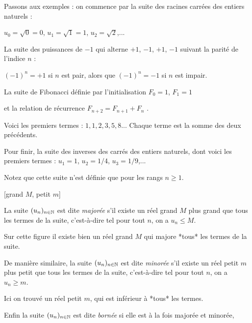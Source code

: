 \change

Passons aux exemples : on commence par la suite des racines carrées des entiers naturels :

$u_0=\sqrt{0}=0$,
$u_1=\sqrt{1}=1$,
$u_2=\sqrt{2}$,...

\change

La suite des puissances de $-1$ qui alterne $+1$, $-1$, $+1$, $-1$ 
suivant la parité de l'indice $n$ :

$(-1)^n = +1$ si $n$ est pair, alors que $(-1)^n = -1$ si $n$ est impair.

\change 

La suite de Fibonacci définie  par l'initialisation $F_0=1$, $F_1=1$ 

\change

et la relation de récurrence $F_{n+2}=F_{n+1}+F_n$ . 

\change

Voici les premiers termes : $1,1,2,3,5,8$... 
Chaque terme est la somme des deux précédents.


\change

Pour finir,  la suite des inverses des carrés des entiers naturels, 
dont voici les premiers termes :
$u_1=1$,
$u_2=1/4$,
$u_3=1/9$,...

Notez que cette suite n'est définie que pour les rangs $n \ge 1$.



\diapo

[grand $M$, petit $m$]

La suite $(u_n)_{n\in \mathbb{N}}$ est dite \emph{majorée} s'il existe un réel 
grand $M$ plus grand que tous les termes de la suite, 
c'est-à-dire tel pour tout $n$, on a $u_n\leq M$.

\change

Sur cette figure il existe bien un réel grand $M$ qui majore *tous* les termes de la suite.

\change


De manière similaire, la suite $(u_n)_{n\in \mathbb{N}}$ est dite \emph{minorée} 
s'il existe un réel petit $m$ plus petit que tous les termes de la suite, 
c'est-à-dire tel pour tout $n$, on a $u_n\geq m$.

\change

Ici on trouvé un réel petit $m$, qui est inférieur à *tous* les termes.

\change


Enfin la suite $(u_n)_{n\in \mathbb{N}}$ est dite \emph{bornée} si  elle est à la fois majorée 
et minorée, 

